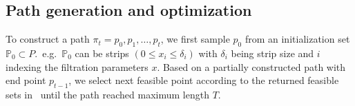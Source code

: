 \documentclass[sigconf, nonacm, natbib=false]{acmart} %
\def\NN{{\mathbb{N}}}
\def\path{\pi}
\let\svtodo\todo
\renewcommand\todo[1]{\svtodo[inline]{#1}}
\newcommand{\RC}[1]{\todo{RC:~#1}}
\theoremstyle{plain}
\begin{document}
\subsection{Path generation and optimization}
To construct a path $\path_{t}=p_0, p_1, \ldots, p_t$, we first sample $p_0$ from an initialization set $\mathbb{P}_0\subset P$.~e.g.~$\mathbb{P}_0$ can be strips $(0 \le x_i \le \delta_i)$ with $\delta_i$ being strip size and $i$ indexing the filtration parameters $x$. Based on a partially constructed path with end point $p_{t-1}$, we select next feasible point according to the returned feasible sets in~ until the path reached maximum length $T$.





\end{document}
